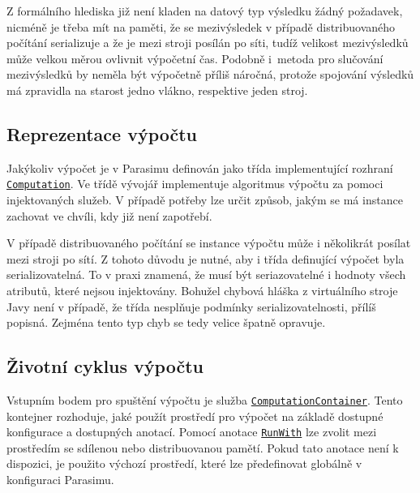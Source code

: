 Z formálního hlediska již není kladen na datový typ výsledku žádný požadavek, nicméně
je třeba mít na paměti, že se mezivýsledek v případě distribuovaného počítání
serializuje a že je mezi stroji posílán po síti, tudíž velikost mezivýsledků může velkou měrou
ovlivnit výpočetní čas. Podobně i~me\-to\-da pro slučování mezivýsledků by neměla být vý\-po\-čet\-ně
příliš ná\-roč\-ná, protože spojování výsledků má zpravidla na starost jedno vlákno, respektive
jeden stroj.

\subsection{Reprezentace výpočtu}

Jakýkoliv výpočet je v Parasimu definován jako třída implementující rozhraní \href{https://github.com/sybila/parasim/blob/2.0.0.Final/extensions/computation-lifecycle-api/src/main/java/org/sybila/parasim/computation/lifecycle/api/Computation.java}{\texttt{Computation}}. Ve třídě vývojář
implementuje algoritmus výpočtu za pomoci injektovaných služeb. V případě potřeby
lze určit způsob, jakým se má instance zachovat ve chvíli, kdy již není zapotřebí.

V případě distribuovaného počítání se instance výpočtu může i ně\-ko\-lik\-rát posílat mezi stroji po sítí. Z tohoto důvodu
je nutné, aby i třída definující výpočet byla serializovatelná. To v praxi znamená, že musí
být seriazovatelné i hodnoty všech atributů, které nejsou injektovány. Bohužel chybová hláška z virtuálního stroje Javy
není v případě, že třída nesplňuje podmínky serializovatelnosti, přílíš popisná.
Zejména tento typ chyb se tedy velice špatně opravuje.

\subsection{Životní cyklus výpočtu}

Vstupním bodem pro spuštění výpočtu je služba \href{https://github.com/sybila/parasim/blob/2.0.0.Final/extensions/computation-lifecycle-api/src/main/java/org/sybila/parasim/computation/lifecycle/api/ComputationContainer.java}{\texttt{ComputationContainer}}. Tento kontejner rozhoduje,
jaké použít prostředí pro výpočet na základě dostupné konfigurace a dostupných anotací.
Pomocí anotace \href{https://github.com/sybila/parasim/blob/2.0.0.Final/extensions/computation-lifecycle-api/src/main/java/org/sybila/parasim/computation/lifecycle/api/annotations/RunWith.java}{\texttt{RunWith}} lze zvolit mezi prostředím se sdílenou nebo distribuovanou pamětí. Pokud tato anotace
není k dispozici, je použito výchozí prostředí, které lze předefinovat globálně v konfiguraci
Parasimu.

